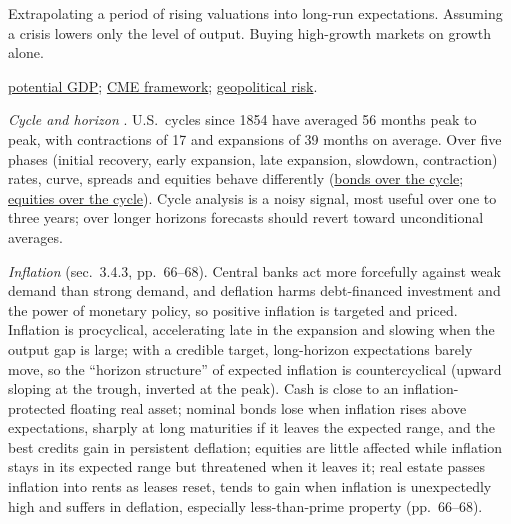 \begin{qfmethod}
 Extrapolating a period of rising valuations into long-run expectations. Assuming a crisis lowers only the level of output. Buying high-growth markets on growth alone.

 \hyperref[meth:potential-gdp-growth-accounting]{potential GDP}; \hyperref[meth:cme-framework-forecasting]{CME framework}; \hyperref[meth:geopolitical-risk-assessment]{geopolitical risk}.

\end{qfmethod}

\begin{qfmethod}\label{meth:cycle-policy-curve-expectations}
 \emph{Cycle and horizon} \citep[chap.~3, sec.~3.4, pp.~61--68]{portfolio-management-in-practice-v1-2020}. U.S.\ cycles since 1854 have averaged 56 months peak to peak, with contractions of 17 and expansions of 39 months on average. Over five phases (initial recovery, early expansion, late expansion, slowdown, contraction) rates, curve, spreads and equities behave differently (\hyperref[meth:cycle-rates-breakevens-spreads]{bonds over the cycle}; \hyperref[meth:cycle-equities-property]{equities over the cycle}). Cycle analysis is a noisy signal, most useful over one to three years; over longer horizons forecasts should revert toward unconditional averages.

\emph{Inflation} (sec.~3.4.3, pp.~66--68). Central banks act more forcefully against weak demand than strong demand, and deflation harms debt-financed investment and the power of monetary policy, so positive inflation is targeted and priced. Inflation is procyclical, accelerating late in the expansion and slowing when the output gap is large; with a credible target, long-horizon expectations barely move, so the ``horizon structure'' of expected inflation is countercyclical (upward sloping at the trough, inverted at the peak). Cash is close to an inflation-protected floating real asset; nominal bonds lose when inflation rises above expectations, sharply at long maturities if it leaves the expected range, and the best credits gain in persistent deflation; equities are little affected while inflation stays in its expected range but threatened when it leaves it; real estate passes inflation into rents as leases reset, tends to gain when inflation is unexpectedly high and suffers in deflation, especially less-than-prime property (pp.~66--68).


\end{qfmethod}
